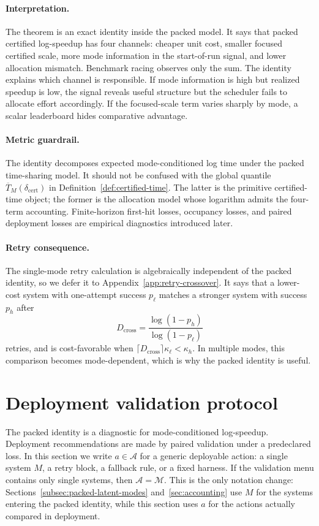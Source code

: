 \documentclass{article}
\newcommand{\cA}{\mathcal{A}}
\newcommand{\cM}{\mathcal{M}}
\begin{document}
\paragraph{Interpretation.}
The theorem is an exact identity inside the packed model.  It says that packed certified
log-speedup has four channels: cheaper unit cost, smaller focused certified scale, more
mode information in the start-of-run signal, and lower allocation mismatch.  Benchmark
racing observes only the sum.  The identity explains which channel is responsible.  If mode
information is high but realized speedup is low, the signal reveals useful structure but the
scheduler fails to allocate effort accordingly.  If the focused-scale term varies sharply by
mode, a scalar leaderboard hides comparative advantage.

\paragraph{Metric guardrail.}
The identity decomposes expected mode-conditioned log time under the packed time-sharing
model.  It should not be confused with the global quantile
\(\overline T_M(\delta_{\mathrm{cert}})\) in Definition~\ref{def:certified-time}.  The latter is the
primitive certified-time object; the former is the allocation model whose logarithm admits
the four-term accounting.  Finite-horizon first-hit losses, occupancy losses, and paired
deployment losses are empirical diagnostics introduced later.


\paragraph{Retry consequence.}
The single-mode retry calculation is algebraically independent of the packed identity, so we defer it to Appendix~\ref{app:retry-crossover}.  It says that a lower-cost system with one-attempt success \(p_\ell\) matches a stronger system with success \(p_h\) after
\[
    D_{\mathrm{cross}}=\frac{\log(1-p_h)}{\log(1-p_\ell)}
\]
retries, and is cost-favorable when \(\lceil D_{\mathrm{cross}}\rceil\kappa_\ell<\kappa_h\).  In multiple modes, this comparison becomes mode-dependent, which is why the packed identity is useful.

\section{Deployment validation protocol}
\label{sec:selection}

The packed identity is a diagnostic for mode-conditioned log-speedup.  Deployment
recommendations are made by paired validation under a predeclared loss.  In this section
we write \(a\in\cA\) for a generic deployable action: a single system \(M\), a retry block,
a fallback rule, or a fixed harness.  If the validation menu contains only single systems,
then \(\cA=\cM\).  This is the only notation change: Sections~\ref{subsec:packed-latent-modes}
and~\ref{sec:accounting} use \(M\) for the systems entering the packed identity, while
this section uses \(a\) for the actions actually compared in deployment.
\end{document}
